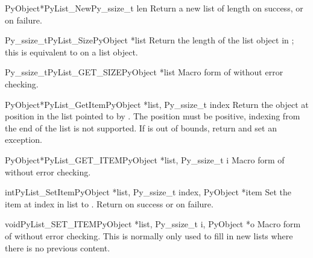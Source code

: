 \begin{cfuncdesc}{PyObject*}{PyList_New}{Py_ssize_t len}
  Return a new list of length  on success, or \NULL{} on
  failure.
\end{cfuncdesc}

\begin{cfuncdesc}{Py_ssize_t}{PyList_Size}{PyObject *list}
  Return the length of the list object in ; this is
  equivalent to  on a list object.
\end{cfuncdesc}

\begin{cfuncdesc}{Py_ssize_t}{PyList_GET_SIZE}{PyObject *list}
  Macro form of  without error checking.
\end{cfuncdesc}

\begin{cfuncdesc}{PyObject*}{PyList_GetItem}{PyObject *list, Py_ssize_t index}
  Return the object at position  in the list pointed to by
  .  The position must be positive, indexing from the end of the
  list is not supported.  If  is out of bounds, return \NULL{}
  and set an  exception.
\end{cfuncdesc}

\begin{cfuncdesc}{PyObject*}{PyList_GET_ITEM}{PyObject *list, Py_ssize_t i}
  Macro form of  without error checking.
\end{cfuncdesc}

\begin{cfuncdesc}{int}{PyList_SetItem}{PyObject *list, Py_ssize_t index,
                                       PyObject *item}
  Set the item at index  in list to .  Return
   on success or  on failure.  
\end{cfuncdesc}

\begin{cfuncdesc}{void}{PyList_SET_ITEM}{PyObject *list, Py_ssize_t i,
                                              PyObject *o}
  Macro form of  without error checking.
  This is normally only used to fill in new lists where there is no
  previous content.
\end{cfuncdesc}

